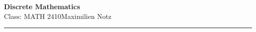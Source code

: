 \documentclass[5pt]{article}
\begin{document}
\begin{center}
     \Large{\textbf{Discrete Mathematics}}\\
     \small{Class: MATH 2410}\hfill\small{\textcopyright Maximilien Notz \the\year{}}
     \noindent\rule{20.2cm}{0.4pt}
\end{center}


\begin{multicols}{2}
\setcounter{secnumdepth}{0}


\end{multicols}
\end{document}
